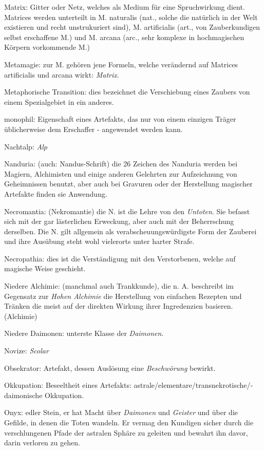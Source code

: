\documentclass[a5paper,8pt]{book}
\begin{document}
\begin{small}
\begin{description}
 \item Matrix: Gitter oder Netz, welches als Medium für eine Spruch­wirkung dient. Matrices werden unterteilt in M. naturalis (nat., solche die natürlich in der Welt existieren und recht unstrukuriert sind), M. artificialis (art., von Zauberkundigen selbst erschaffene M.) und M. arcana (arc., sehr komplexe in hochmagischen Körpern vor­kommende M.)
 \item Metamagie: zur M. gehören jene Formeln, welche ver­ändernd auf Matrices artificialis und arcana wirkt: \textit{Matrix}.
 \item Metaphorische Transition: dies bezeichnet die Ver­schiebung eines Zaubers von einem Spezialgebiet in ein anderes.
 \item monophil: Eigenschaft eines Artefakts, das nur von einem einzigen Träger üblicherweise dem Erschaffer - angewendet werden kann.
 \item Nachtalp: \textit{Alp}
 \item Nanduria: (auch: Nandus-Schrift) die 26 Zeichen des Nanduria werden bei Magiern, Alchimisten und einige anderen Gelehrten zur Aufzeichnung von Geheimnissen benutzt, aber auch bei Gravuren oder der Herstellung magischer \textit{}Artefakte finden sie Anwendung.
 \item Necromantia: (Nekromantie) die N. ist die Lehre von den \textit{Untoten}. Sie befasst sich mit der gar ­lästerlichen Erweckung, aber auch mit der Beherrschung derselben. Die N. gilt allgemein als ver­abscheuungs­würdigste Form der Zauberei und ihre Aus­übung steht wohl vielerorts unter harter Strafe.
 \item Necropathia: dies ist die Ver­ständigung mit den Verstorbenen, welche auf magische Weise geschieht.
 \item Niedere Alchimie: (manchmal auch Trankkunde), die n. A. beschreibt im Gegensatz zur \textit{Hohen Alchimie} die Herstellung von einfachen Rezepten und Tränken die meist auf der direkten Wirkung ihrer Ingredenzien basieren. (\textit{}Alchimie)
 \item Niedere Daimonen: unterste Klasse der \textit{Daimonen}. 
 \item Novize: \textit{Scolar}
 \item Obsekrator: Artefakt, dessen Auslösung eine \textit{Beschwörung} bewirkt.
 \item Okkupation: Beseeltheit eines Artefakts: astrale/­elementare/­­transnekrotische/­daimonische Okkupation.
 \item Onyx: edler Stein, er hat Macht über \textit{Daimonen} und \textit{Geister} und über die Gefilde, in denen die Toten wandeln. Er vermag den Kundigen sicher durch die verschlungenen Pfade der astralen Sphäre zu geleiten und bewahrt ihn davor, darin verloren zu gehen.

\end{description}
\end{small}
\end{document}
